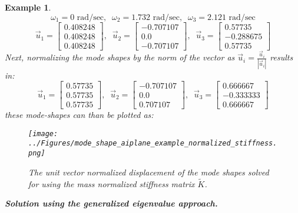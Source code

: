 \documentclass[12pt,letter]{article}
\newtheorem{ex}{Example}
\numberwithin{ex}{section} %
\newenvironment{example}{\begin{mdframed}[middlelinewidth=0.5mm]\begin{ex}\normalfont}{\end{ex}\end{mdframed}}
\numberwithin{re}{section} %
\begin{document}
\begin{example}
\begin{equation}
\omega_1 = 0  \text{ rad/sec}, \; \; \omega_2 = 1.732 \text{ rad/sec}, \; \; \omega_3 = 2.121  \text{ rad/sec}
\end{equation}
\begin{equation}
\vec{u}_1 = \begin{bmatrix} 0.408248 \\    0.408248 \\    0.408248  \end{bmatrix}, \; \; \vec{u}_2 = \begin{bmatrix} -0.707107 \\    0.0 \\    -0.707107 \end{bmatrix}, \; \; \vec{u}_3 = \begin{bmatrix} 0.57735 \\    -0.288675 \\    0.57735  \end{bmatrix}
\end{equation}
Next, normalizing the mode shapes by the norm of the vector as $\vec{u}_i = \frac{\vec{u}_i}{|\vec{u}_i|}$ results in:
\begin{equation}
\vec{u}_1 = \begin{bmatrix} 0.57735 \\    0.57735 \\    0.57735  \end{bmatrix}, \; \; \vec{u}_2 = \begin{bmatrix} -0.707107 \\    0.0 \\    0.707107 \end{bmatrix}, \; \; \vec{u}_3 = \begin{bmatrix} 0.666667 \\    -0.333333 \\    0.666667  \end{bmatrix}
\end{equation}
these mode-shapes can than be plotted as:
\begin{figure}[H]
	\centering
	\texttt{[image: ../Figures/mode\_shape\_aiplane\_example\_normalized\_stiffness.png]}
	\caption{The unit vector normalized displacement of the mode shapes solved for using the mass normalized stiffness matrix $\tilde{K}$.}
	\label{fig:mode_shape_aiplane_example_normalized_stiffness}
\end{figure}



\vspace{2ex}
\noindent \textbf{Solution using the generalized eigenvalue approach.}
\vspace{1ex}


\end{example}
\end{document}
